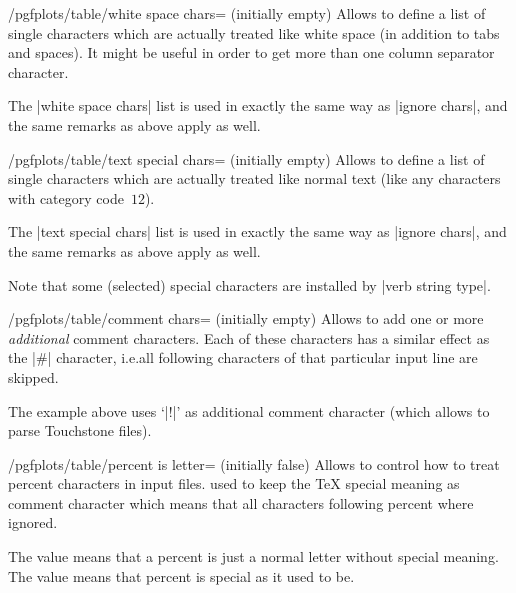 \documentclass[a4paper]{ltxdoc}
\begin{document}
\begin{key}{/pgfplots/table/white space chars= (initially empty)}
    Allows to define a list of single characters which are actually treated
    like white space (in addition to tabs and spaces). It might be useful in
    order to get more than one column separator character.

    The |white space chars| list is used in exactly the same way as
    |ignore chars|, and the same remarks as above apply as well.
\end{key}

\begin{key}{/pgfplots/table/text special chars= (initially empty)}
    Allows to define a list of single characters which are actually treated
    like normal text (like any characters with category code~$12$).

    The |text special chars| list is used in exactly the same way as
    |ignore chars|, and the same remarks as above apply as well.

    Note that some (selected) special characters are installed by
    |verb string type|.
\begin{codeexample}[]
\end{codeexample}
\end{key}

\begin{key}{/pgfplots/table/comment chars= (initially empty)}
    Allows to add one or more \emph{additional} comment characters. Each of
    these characters has a similar effect as the |#| character, i.e.\@ all
    following characters of that particular input line are skipped.
\begin{codeexample}[]
\end{codeexample}
    The example above uses `|!|' as additional comment character (which allows
    to parse Touchstone files).
\end{key}

\begin{key}{/pgfplots/table/percent is letter= (initially false)}
    Allows to control how to treat percent characters in input files.
    \PGFPlotstable{} used to keep the \TeX{} special meaning as comment
    character which means that all characters following percent where ignored.

    The value  means that a percent is just a normal letter
    without special meaning. The value  means that percent
    is special as it used to be.
\end{key}
\end{document}
